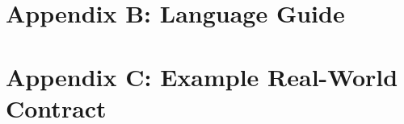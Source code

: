 \documentclass[12pt,twoside]{report}
\begin{document}
\setcounter{chapter}{8}
\setcounter{section}{0}
\chapter*{Appendix B: Language Guide}
\label{chp:appendix-b}


\setcounter{chapter}{9}
\setcounter{section}{0}
\chapter*{Appendix C: Example Real-World Contract}
\label{chp:appendix-c}

\end{document}
